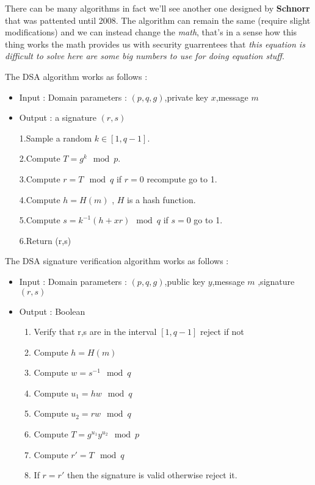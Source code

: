 \documentclass[11pt]{article}
\providecommand{\tightlist}{%
      \setlength{\itemsep}{0pt}\setlength{\parskip}{0pt}}
\begin{document}
There can be many algorithms in fact we'll see another one designed by
\textbf{Schnorr} that was pattented until 2008. The algorithm can remain
the same (require slight modifications) and we can instead change the
\emph{math}, that's in a sense how this thing works the math provides us
with security guarrentees that \emph{this equation is difficult to solve
here are some big numbers to use for doing equation stuff}.

The DSA algorithm works as follows :

\begin{itemize}
\item
  Input : Domain parameters : \((p,q,g)\),private key \(x\),message
  \(m\)
\item
  Output : a signature \((r,s)\)

  1.Sample a random \(k \in [1,q-1]\).

  2.Compute \(T = g^k \mod p\).

  3.Compute \(r = T \mod q\) if \(r=0\) recompute go to 1.

  4.Compute \(h = H(m)\) , \(H\) is a hash function.

  5.Compute \(s = k^{-1} ( h + xr) \mod q\) if \(s=0\) go to 1.

  6.Return (r,s)
\end{itemize}

The DSA signature verification algorithm works as follows :

\begin{itemize}
\item
  Input : Domain parameters : \((p,q,g)\),public key \(y\),message \(m\)
  ,signature \((r,s)\)
\item
  Output : Boolean

  \begin{enumerate}
  \def\labelenumi{\arabic{enumi}.}
  \tightlist
  \item
    Verify that r,s are in the interval \([1,q-1]\) reject if not
  \item
    Compute \(h = H(m)\)
  \item
    Compute \(w = s^{-1} \mod q\)
  \item
    Compute \(u_1 = hw \mod q\)
  \item
    Compute \(u_2 = rw \mod q\)
  \item
    Compute \(T = g^{u_1}y^{u_2} \mod p\)
  \item
    Compute \(r' = T \mod q\)
  \item
    If \(r = r'\) then the signature is valid otherwise reject it.
  \end{enumerate}
\end{itemize}
\end{document}
